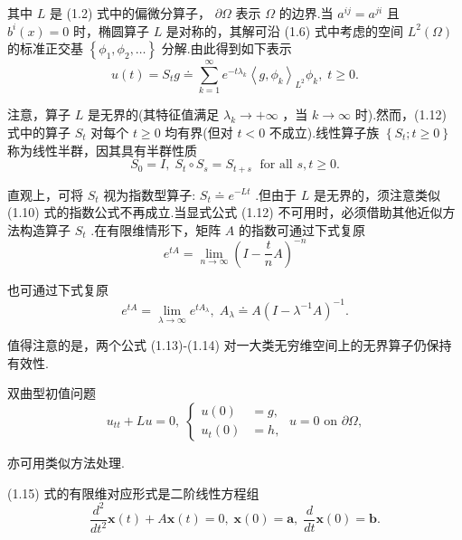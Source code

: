 其中 $L$ 是 (1.2) 式中的偏微分算子， $\partial \Omega$ 表示 $\Omega$ 的边界.当 ${a}^{ij} = {a}^{ji}$ 且 ${b}^{i}\left( x\right)  = 0$ 时，椭圆算子 $L$ 是对称的，其解可沿 (1.6) 式中考虑的空间 $L^2\left( \Omega \right)$ 的标准正交基 $\left\{  {{\phi }_{1},{\phi }_{2},\ldots }\right\}$ 分解.由此得到如下表示
\begin{equation}\tag{1.12}
u\left( t\right)  = {S}_{t}g \doteq  \mathop{\sum }\limits_{{k = 1}}^{\infty }{e}^{-t{\lambda }_{k}}{\left\langle  g,{\phi }_{k}\right\rangle  }_{L^2}{\phi }_{k},\;t \geq  0.
\end{equation}

注意，算子 $L$ 是无界的(其特征值满足 ${\lambda }_{k} \rightarrow   + \infty$ ，当 $k \rightarrow  \infty$ 时).然而，(1.12) 式中的算子 ${S}_{t}$ 对每个 $t \geq  0$ 均有界(但对 $t < 0$ 不成立).线性算子族 $\left\{  {{S}_{t};t \geq  0}\right\}$ 称为线性半群，因其具有半群性质
\[
{S}_{0} = I,\;{S}_{t} \circ  {S}_{s} = {S}_{t + s}\;\text{ for all }s,t \geq  0.
\]

直观上，可将 ${S}_{t}$ 视为指数型算子: ${S}_{t} \doteq  {e}^{-{Lt}}$ .但由于 $L$ 是无界的，须注意类似 (1.10) 式的指数公式不再成立.当显式公式 (1.12) 不可用时，必须借助其他近似方法构造算子 ${S}_{t}$ .在有限维情形下，矩阵 $A$ 的指数可通过下式复原
\begin{equation}\tag{1.13}
{e}^{tA} = \mathop{\lim }\limits_{{n \rightarrow  \infty }}{\left( I - \frac{t}{n}A\right) }^{-n}
\end{equation}

也可通过下式复原
\begin{equation}\tag{1.14}
{e}^{tA} = \mathop{\lim }\limits_{{\lambda  \rightarrow  \infty }}{e}^{t{A}_{\lambda }},\;{A}_{\lambda } \doteq  A{\left( I - {\lambda }^{-1}A\right) }^{-1}.
\end{equation}

值得注意的是，两个公式 (1.13)-(1.14) 对一大类无穷维空间上的无界算子仍保持有效性.

双曲型初值问题
\begin{equation}\tag{1.15}
{u}_{tt} + {Lu} = 0,\;\begin{cases} u\left( 0\right) &  = g, \\  {u}_{t}\left( 0\right) &  = h, \end{cases}\;u = 0\text{ on }\partial \Omega ,
\end{equation}

亦可用类似方法处理.

(1.15) 式的有限维对应形式是二阶线性方程组
\begin{equation}\tag{1.16}
\frac{{d}^{2}}{d{t}^{2}}\bm{x}\left( t\right)  + A\bm{x}\left( t\right)  = 0,\;\bm{x}\left( 0\right)  = \bm{a},\;\frac{d}{dt}\bm{x}\left( 0\right)  = \bm{b}.
\end{equation}

